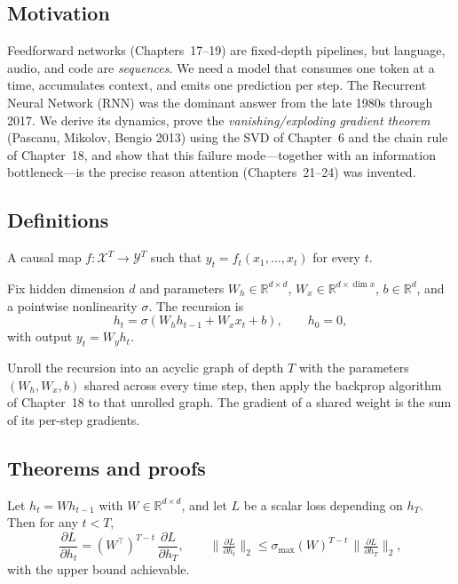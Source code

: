 \subsection*{Motivation}

Feedforward networks (Chapters~17--19) are fixed-depth pipelines, but
language, audio, and code are \emph{sequences}. We need a model that
consumes one token at a time, accumulates context, and emits one prediction
per step. The Recurrent Neural Network (RNN) was the dominant answer
from the late 1980s through 2017. We derive its dynamics, prove the
\emph{vanishing/exploding gradient theorem} (Pascanu, Mikolov, Bengio
2013) using the SVD of Chapter~6 and the chain rule of Chapter~18, and
show that this failure mode---together with an information bottleneck---is
the precise reason attention (Chapters~21--24) was invented.

\subsection*{Definitions}

\begin{definition}
A causal map $f : \mathcal{X}^T \to \mathcal{Y}^T$ such that
$y_t = f_t(x_1, \dots, x_t)$ for every $t$.
\end{definition}

\begin{definition}
Fix hidden dimension $d$ and parameters
$W_h \in \mathbb{R}^{d \times d}$,
$W_x \in \mathbb{R}^{d \times \dim x}$, $b \in \mathbb{R}^d$, and a
pointwise nonlinearity $\sigma$. The recursion is
\[
  h_t = \sigma(W_h h_{t-1} + W_x x_t + b), \qquad h_0 = 0,
\]
with output $y_t = W_y h_t$.
\end{definition}

\begin{definition}
Unroll the recursion into an acyclic graph of depth $T$ with the
parameters $(W_h, W_x, b)$ shared across every time step, then apply
the backprop algorithm of Chapter~18 to that unrolled graph. The
gradient of a shared weight is the sum of its per-step gradients.
\end{definition}

\subsection*{Theorems and proofs}

\begin{theorem}
\label{thm:vanish}
Let $h_t = W h_{t-1}$ with $W \in \mathbb{R}^{d \times d}$, and let
$L$ be a scalar loss depending on $h_T$. Then for any $t < T$,
\[
  \frac{\partial L}{\partial h_t}
  = (W^\top)^{T-t}\,\frac{\partial L}{\partial h_T},
  \qquad
  \Big\|\tfrac{\partial L}{\partial h_t}\Big\|_2
  \leq \sigma_{\max}(W)^{T-t}\,
       \Big\|\tfrac{\partial L}{\partial h_T}\Big\|_2,
\]
with the upper bound achievable.
\end{theorem}

